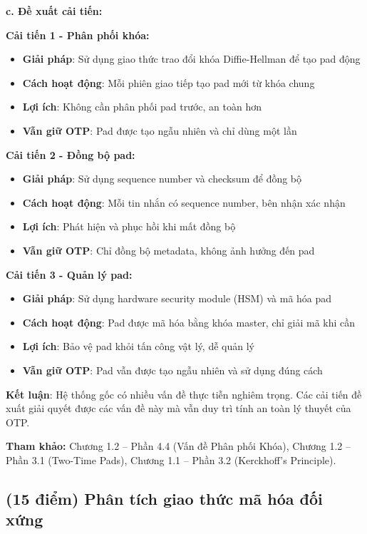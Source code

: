 \textbf{c. Đề xuất cải tiến:}

\textbf{Cải tiến 1 - Phân phối khóa:}
\begin{itemize}
    \item \textbf{Giải pháp}: Sử dụng giao thức trao đổi khóa Diffie-Hellman để tạo pad động
    \item \textbf{Cách hoạt động}: Mỗi phiên giao tiếp tạo pad mới từ khóa chung
    \item \textbf{Lợi ích}: Không cần phân phối pad trước, an toàn hơn
    \item \textbf{Vẫn giữ OTP}: Pad được tạo ngẫu nhiên và chỉ dùng một lần
\end{itemize}

\textbf{Cải tiến 2 - Đồng bộ pad:}
\begin{itemize}
    \item \textbf{Giải pháp}: Sử dụng sequence number và checksum để đồng bộ
    \item \textbf{Cách hoạt động}: Mỗi tin nhắn có sequence number, bên nhận xác nhận
    \item \textbf{Lợi ích}: Phát hiện và phục hồi khi mất đồng bộ
    \item \textbf{Vẫn giữ OTP}: Chỉ đồng bộ metadata, không ảnh hưởng đến pad
\end{itemize}

\textbf{Cải tiến 3 - Quản lý pad:}
\begin{itemize}
    \item \textbf{Giải pháp}: Sử dụng hardware security module (HSM) và mã hóa pad
    \item \textbf{Cách hoạt động}: Pad được mã hóa bằng khóa master, chỉ giải mã khi cần
    \item \textbf{Lợi ích}: Bảo vệ pad khỏi tấn công vật lý, dễ quản lý
    \item \textbf{Vẫn giữ OTP}: Pad vẫn được tạo ngẫu nhiên và sử dụng đúng cách
\end{itemize}

\textbf{Kết luận}: Hệ thống gốc có nhiều vấn đề thực tiễn nghiêm trọng. Các cải tiến đề xuất giải quyết được các vấn đề này mà vẫn duy trì tính an toàn lý thuyết của OTP.

\textbf{Tham khảo:} Chương 1.2 – Phần 4.4 (Vấn đề Phân phối Khóa), Chương 1.2 – Phần 3.1 (Two-Time Pads), Chương 1.1 – Phần 3.2 (Kerckhoff's Principle).

\subsection{(15 điểm) Phân tích giao thức mã hóa đối xứng}

